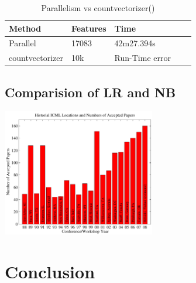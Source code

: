 \documentclass{article}
\begin{document}
\begin{table}[H]
\caption{Parallelism vs countvectorizer()}
\label{sample-table}
\begin{center}
\begin{small}
\begin{sc}
\begin{tabular}{lllll}
\hline
Method & Features & Time \\
\hline
Parallel  & 17083 & 42m27.394s \\
countvectorizer  & 10k & Run-Time error \\
\hline
\end{tabular}
\end{sc}
\end{small}
\end{center}
\end{table}



\subsection{Comparision of LR and NB}
\includegraphics[width=0.5\textwidth]{icml_numpapers}



\section{Conclusion}
\nocite{langley00}



\end{document}
